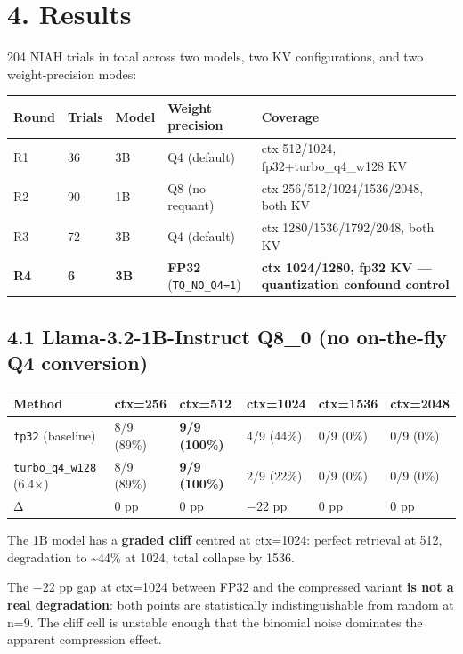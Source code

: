 \documentclass[11pt]{article}
\begin{document}
\section*{4. Results}


204 NIAH trials in total across two models, two KV configurations, and two weight-precision modes:


\begin{center}
\begin{tabular}{lllll}
\toprule
Round & Trials & Model & Weight precision & Coverage \\
\midrule
R1 & 36 & 3B & Q4 (default) & ctx 512/1024, fp32+turbo\_q4\_w128 KV \\
R2 & 90 & 1B & Q8 (no requant) & ctx 256/512/1024/1536/2048, both KV \\
R3 & 72 & 3B & Q4 (default) & ctx 1280/1536/1792/2048, both KV \\
\textbf{R4} & \textbf{6} & \textbf{3B} & \textbf{FP32} (\texttt{TQ\_NO\_Q4=1}) & \textbf{ctx 1024/1280, fp32 KV — quantization confound control} \\
\bottomrule
\end{tabular}
\end{center}


\subsection*{4.1 Llama-3.2-1B-Instruct Q8\_0 (no on-the-fly Q4 conversion)}


\begin{center}
\begin{tabular}{llllll}
\toprule
Method & ctx=256 & ctx=512 & ctx=1024 & ctx=1536 & ctx=2048 \\
\midrule
\texttt{fp32} (baseline) & 8/9 (89\%) & \textbf{9/9 (100\%)} & 4/9 (44\%) & 0/9 (0\%) & 0/9 (0\%) \\
\texttt{turbo\_q4\_w128} (6.4×) & 8/9 (89\%) & \textbf{9/9 (100\%)} & 2/9 (22\%) & 0/9 (0\%) & 0/9 (0\%) \\
Δ & 0 pp & 0 pp & −22 pp & 0 pp & 0 pp \\
\bottomrule
\end{tabular}
\end{center}


The 1B model has a \textbf{graded cliff} centred at ctx=1024: perfect retrieval at 512, degradation to \textasciitilde{}44\% at 1024, total collapse by 1536.


The −22 pp gap at ctx=1024 between FP32 and the compressed variant \textbf{is not a real degradation}: both points are statistically indistinguishable from random at n=9. The cliff cell is unstable enough that the binomial noise dominates the apparent compression effect.
\end{document}
